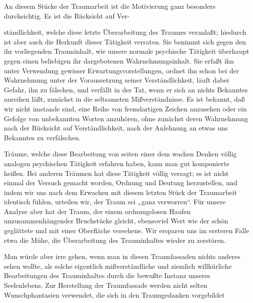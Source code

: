 \documentclass{article}
\begin{document}
            
        \pstart
        An diesem Stücke der Traumarbeit ist die Motivierung ganz besonders
               durchsichtig. Es ist die Rücksicht auf Ver-
        \pend
    
         
            
            
            
        \pstart
        ständlichkeit, welche diese letzte
               Überarbeitung des Traumes veranlaßt; hiedurch ist aber auch die Herkunft dieser
               Tätigkeit verraten. Sie benimmt sich gegen den ihr vorliegenden Trauminhalt, wie unsere normale psychische Tätigkeit überhaupt gegen
               einen beliebigen ihr dargebotenen Wahrnehmungsinhalt. Sie erfaßt ihn unter
               Verwendung gewisser Erwartungsvorstellungen, ordnet ihn schon bei der
               Wahrnehmung unter der Voraussetzung seiner Verständlichkeit, läuft dabei Gefahr,
               ihn zu fälschen, und verfällt in der Tat, wenn er sich an nichts Bekanntes
               anreihen läßt, zunächst in die seltsamsten Mißverständnisse. Es ist
               bekannt, daß wir nicht imstande sind, eine Reihe von fremdartigen Zeichen
               anzusehen oder ein Gefolge von unbekannten Worten anzuhören, ohne zunächst deren
               Wahrnehmung nach der Rücksicht auf Verständlichkeit,
               nach der Anlehnung an etwas uns Bekanntes zu verfälschen.
        \pend
    
            
        \pstart
        Träume, welche diese Bearbeitung von seiten einer dem wachen Denken völlig
               analogen psychischen Tätigkeit erfahren haben, kann man gut komponierte heißen. Bei anderen Träumen hat
               diese Tätigkeit völlig versagt; es ist nicht einmal der Versuch gemacht worden,
               Ordnung und Deutung herzustellen, und indem wir uns nach dem Erwachen mit diesem
               letzten Stück der Traumarbeit identisch fühlen, urteilen wir, der
               Traum sei „ganz verworren“. Für unsere Analyse aber hat der Traum,
               der einem ordnungslosen Haufen unzusammenhängender Bruchstücke gleicht,
               ebensoviel Wert wie der schön geglättete und mit einer Oberfläche
               versehene. Wir ersparen uns im ersteren Falle etwa die Mühe, die Überarbeitung
               des Trauminhaltes wieder zu zerstören.
        \pend
    
            
        \pstart
        Man würde aber irre gehen, wenn man in diesen Traumfassaden nichts
               anderes sehen wollte, als solche eigentlich mißverständliche und
               ziemlich willkürliche Bearbeitungen des Trauminhaltes durch die
               bewußte Instanz unseres Seelenlebens. Zur Herstellung der Traumfassade werden
               nicht selten Wunschphantasien verwendet, die sich in den
               Traumgedanken vorgebildet
        \pend
    
\end{document}
